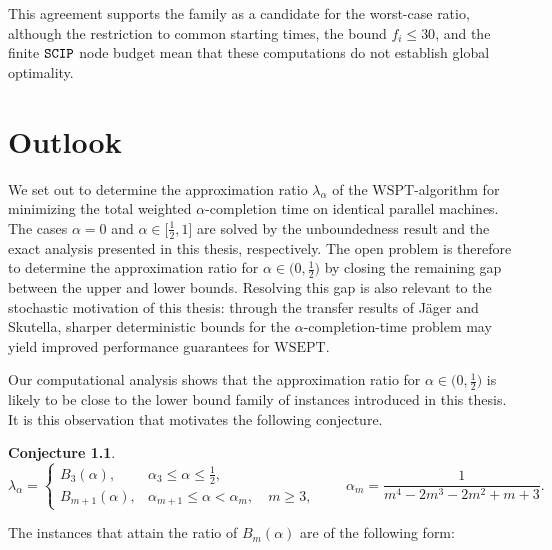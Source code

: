 \documentclass[%
english, titlepage=false %
]{./tum-templates/book/tumbook}
\newtheorem{conjecture}{Conjecture}
\begin{document}
This agreement supports the family as a candidate for the worst-case ratio,
although the restriction to common starting times, the bound $f_i\leq30$, and
the finite $\verb|SCIP|$ node budget mean that these computations do not establish
global optimality.

\chapter{Outlook}\label{chap:outlook}
We set out to determine the approximation ratio \(\lambda_{\alpha}\) of the
\(\mathrm{WSPT}\)-algorithm for minimizing the total weighted
\(\alpha\)-completion time on identical parallel machines.
The cases $\alpha=0$ and $\alpha\in\Big[\frac12,1\Big]$ are solved by the
unboundedness result and the exact analysis presented in this thesis,
respectively. The open problem is therefore to determine the
approximation ratio for $\alpha\in\Big(0,\frac12\Big)$ by closing the remaining
gap between the upper and lower bounds. Resolving this gap is
also relevant to the stochastic motivation of this thesis: through the
transfer results of Jäger and Skutella, sharper deterministic bounds for
the $\alpha$-completion-time problem may yield improved performance
guarantees for $\mathrm{WSEPT}$.\medskip


Our computational analysis shows that the approximation ratio for $\alpha\in\Big(0,\frac12\Big)$ is likely to be close to the lower bound family of instances introduced in this thesis.
It is this observation that motivates the following conjecture.
\begin{conjecture}
\[
\lambda_{\alpha} =
\begin{cases}
B_3(\alpha),
& \displaystyle \alpha_3\leq\alpha\leq\frac12,\\[6pt]
B_{m+1}(\alpha),
& \alpha_{m+1}\leq\alpha<\alpha_{m},\quad m\geq 3,
\end{cases}
\qquad
\alpha_m=\frac{1}{m^4-2m^3-2m^2+m+3}.
\]
\end{conjecture}
The instances that attain the ratio of $B_{m}(\alpha)$ are of the following form:
\end{document}
